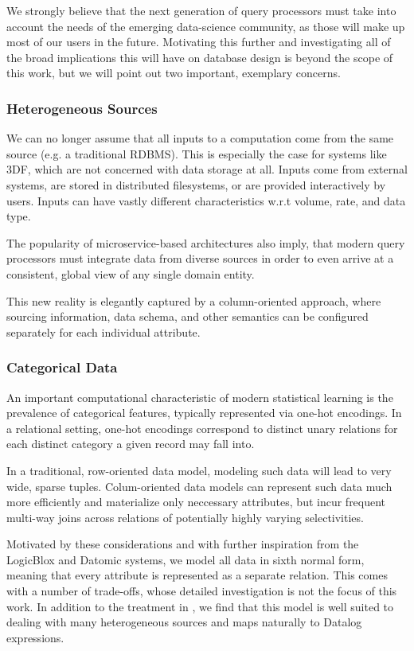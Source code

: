 \documentclass[../index.tex]{subfiles}
\begin{document}
We strongly believe that the next generation of query processors must
take into account the needs of the emerging data-science community, as
those will make up most of our users in the future. Motivating this
further and investigating all of the broad implications this will have
on database design is beyond the scope of this work, but we will point
out two important, exemplary concerns.

\subsubsection{Heterogeneous Sources}

We can no longer assume that all inputs to a computation come from the
same source (e.g. a traditional RDBMS). This is especially the case
for systems like 3DF, which are not concerned with data storage at
all. Inputs come from external systems, are stored in distributed
filesystems, or are provided interactively by users. Inputs can have
vastly different characteristics w.r.t volume, rate, and data type.

The popularity of microservice-based architectures also imply, that
modern query processors must integrate data from diverse sources in
order to even arrive at a consistent, global view of any single domain
entity.

This new reality is elegantly captured by a column-oriented approach,
where sourcing information, data schema, and other semantics can be
configured separately for each individual attribute.

\subsubsection{Categorical Data}

An important computational characteristic of modern statistical
learning is the prevalence of categorical features, typically
represented via one-hot encodings. In a relational setting, one-hot
encodings correspond to distinct unary relations for each distinct
category a given record may fall into.

In a traditional, row-oriented data model, modeling such data will
lead to very wide, sparse tuples. Colum-oriented data models can
represent such data much more efficiently and materialize only
neccessary attributes, but incur frequent multi-way joins across
relations of potentially highly varying selectivities.

Motivated by these considerations and with further inspiration from
the LogicBlox and Datomic systems, we model all data in sixth normal
form, meaning that every attribute is represented as a separate
relation. This comes with a number of trade-offs, whose detailed
investigation is not the focus of this work. In addition to the
treatment in \cite{aref2015design}, we find that this model is well
suited to dealing with many heterogeneous sources and maps naturally
to Datalog expressions.
\end{document}
